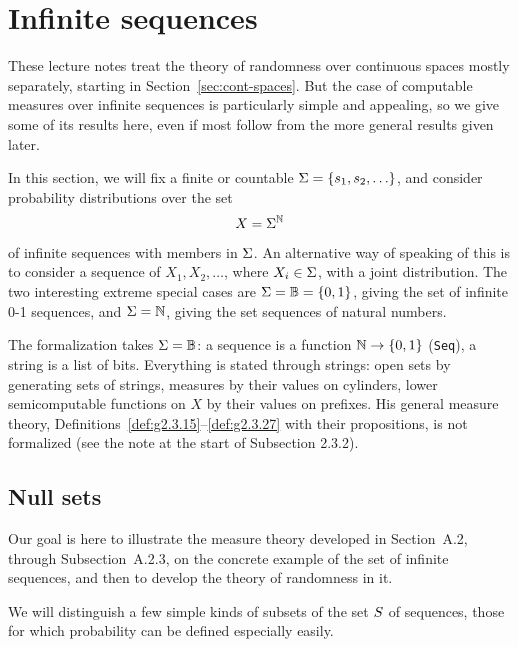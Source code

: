 \section{Infinite sequences}

These lecture notes treat the theory of randomness over continuous spaces mostly
separately, starting in Section~\ref{sec:cont-spaces}.
But the case of computable measures over infinite sequences is particularly
simple and appealing, so we give some of its results here, even if most
follow from the more general results given later.

In this section, we will fix a finite or countable 
\( \Sg=\set{s_{1},s_{2},\dots} \), and consider
probability distributions over the set
\begin{align*}
   X = \Sg^{\dN}
 \end{align*}
of infinite sequences with members in \( \Sg \).
An alternative way of speaking of this is to consider a sequence of
 \( X_{1},X_{2},\dots \), where \( X_{i}\in\Sg \), with a joint
distribution.
The two interesting extreme special cases are \( \Sg=\dB=\{0,1\} \), giving the set
of infinite 0-1 sequences, and \( \Sg=\dN \), giving the set sequences of natural
numbers.

\begin{formalization}
The formalization takes \( \Sg = \dB \): a sequence is a function \( \dN \to \{0,1\} \)
(\texttt{Seq}), a string is a list of bits. Everything is stated through strings: open sets
by generating sets of strings, measures by their values on cylinders, lower semicomputable
functions on \( X \) by their values on prefixes. His general measure theory,
Definitions~\ref{def:g2.3.15}--\ref{def:g2.3.27} with their propositions, is not formalized
(see the note at the start of Subsection 2.3.2).
\end{formalization}

\subsection{Null sets}

Our goal is here to illustrate the measure theory developed in
Section~A.2, through Subsection~A.2.3,
on the concrete example of the set
of infinite sequences, and then to develop the theory of randomness
in it.

We will distinguish a few simple kinds of subsets of the set \( \S \) of sequences,
those for which probability can be defined especially easily.

